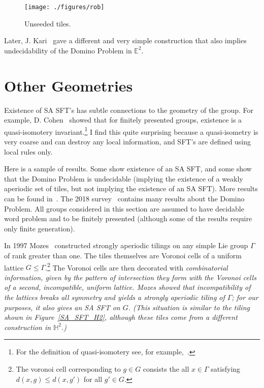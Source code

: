 \documentclass[12pt,reqno]{amsart}
\theoremstyle{plain}
\theoremstyle{definition}
\numberwithin{subcase}{case}
\theoremstyle{plain}
\theoremstyle{definition}
\begin{document}

\begin{figure}
\centerline{{\texttt{[image: ./figures/rob]}}}
\caption{Unseeded tiles.}
\label{UnseededTiles}
\end{figure}


Later, J. Kari~\cite{MR1417578} gave a different and very simple construction that also implies undecidability of the Domino Problem in \(\mathbb{E}^{2}\).

\section{Other Geometries}

Existence of SA SFT's has subtle connections to the geometry of the group. For example, D. Cohen~\cite{DBCohen} showed that for finitely presented groups, existence is a quasi-isomotery invariant.\footnote{For the definition of quasi-isomotery see, for example,~\cite{BridsonHaefliger}.} 
I find this quite surprising because a quasi-isometry is very coarse and can destroy any local information, and SFT's are defined using local rules only. 

Here is a sample of results. Some show existence of an SA SFT, and some show that the Domino Problem is undecidable (implying the existence of a weakly aperiodic set of tiles, but not implying the existence of an SA SFT). 
More results can be found in~\cite{cohen_goodman-strauss_rieck_2021}. The 2018 survey~\cite{DominoSurvey} contains many results about the Domino Problem.  All groups considered in this section are assumed to have decidable word problem and to be finitely presented (although some of the results require only finite generation). 
 
In 1997 Mozes~\cite{mozes} constructed strongly aperiodic tilings on any simple Lie group \(\Gamma\) of rank greater than one. The tiles themselves are Voronoi cells of a uniform lattice \(G \leq \Gamma\).\footnote{The voronoi cell  corresponding to \(g \in G\) consists the all \(x \in \Gamma\) satisfying \(d(x,g) \leq d(x,g')\) for all \(g' \in G\).}  
The Voronoi cells are then decorated with \em combinatorial \em information, given by the pattern of intersection they form with the Voronoi cells of a second, incompatible, uniform lattice. Mozes showed that incompatibility of the lattices breaks all symmetry and yields a strongly aperiodic tiling of \(\Gamma\); for our purposes, it also gives an SA SFT on \(G\).
(This situation is similar to the tiling shown in Figure~\ref{SA_SFT_H2}, although these tiles come from a different construction in \(\mathbb{H}^{2}\).) 
\end{document}

